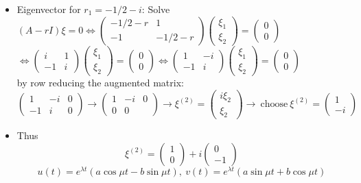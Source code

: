 \documentclass[11pt,a4paper]{article}
\begin{document}
	\begin{itemize}
		\item Eigenvector for $r_1 = -1/2 - i$: Solve\\
		$
		(A-rI)\xi = 0 \Leftrightarrow
		\begin{pmatrix}
			-1/2-r & 1\\
			-1 & -1/2-r
		\end{pmatrix}
		\begin{pmatrix}
			\xi_1\\
			\xi_2
		\end{pmatrix} = 
		\begin{pmatrix}
			0\\
			0
		\end{pmatrix}
		$\\
		$
		\Leftrightarrow
		\begin{pmatrix}
			i & 1\\
			-1 & i
		\end{pmatrix}
		\begin{pmatrix}
			\xi_1\\
			\xi_2
		\end{pmatrix}=
		\begin{pmatrix}
			0\\
			0
		\end{pmatrix}\Leftrightarrow
		\begin{pmatrix}
			1 & -i\\
			-1 & i
		\end{pmatrix}
		\begin{pmatrix}
			\xi_1\\
			\xi_2
		\end{pmatrix}=
		\begin{pmatrix}
			0\\
			0
		\end{pmatrix}
		$\\
		by row reducing the augmented matrix:\\
		$
		\begin{pmatrix}
			1 & -i & 0\\
			-1 & i & 0
		\end{pmatrix}\to
		\begin{pmatrix}
			1 & -i & 0\\
			0 & 0 &
		\end{pmatrix}\to \xi^{(2)} =
		\begin{pmatrix}
			i\xi_2\\
			\xi_2
		\end{pmatrix}\to \ \text{choose}\ \xi^{(2)}=
		\begin{pmatrix}
			1\\
			-i
		\end{pmatrix}
		$
		\item Thus
		$$
		\xi^{(2)} =
		\begin{pmatrix}
			1\\
			0
		\end{pmatrix} + i
		\begin{pmatrix}
			0\\
			-1
		\end{pmatrix}
		$$
		$$
		u(t) = e^{\lambda t}(a\cos \mu t-b\sin \mu t),\ v(t) = e^{\lambda t}(a\sin \mu t + b\cos \mu t)
		$$
	\end{itemize}
\end{document}
